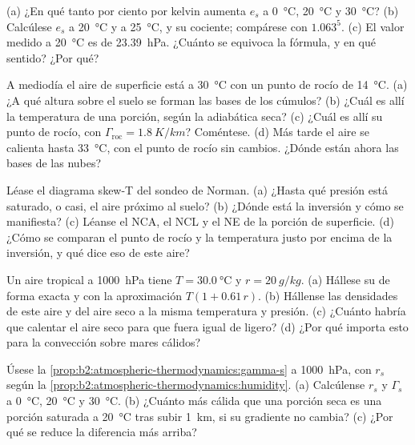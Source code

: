 \begin{exercise}[$\star$]\label{exo:b2:atmospheric-thermodynamics:2}
(a) ¿En qué tanto por ciento por kelvin aumenta $e_s$ a \qty{0}{\celsius}, \qty{20}{\celsius} y
\qty{30}{\celsius}? (b) Calcúlese $e_s$ a \qty{20}{\celsius} y a \qty{25}{\celsius}, y su
cociente; compárese con $1.063^5$. (c) El valor medido a \qty{20}{\celsius} es de
\qty{23.39}{hPa}. ¿Cuánto se equivoca la fórmula, y en qué sentido? ¿Por qué?
\end{exercise}

\begin{exercise}[$\star$]\label{exo:b2:atmospheric-thermodynamics:3}
A mediodía el aire de superficie está a \qty{30}{\celsius} con un punto de rocío de \qty{14}{\celsius}. (a) ¿A
qué altura sobre el suelo se forman las bases de los cúmulos? (b) ¿Cuál es allí la temperatura de una porción,
según la adiabática seca? (c) ¿Cuál es allí su punto de rocío, con $\Gamma_{\text{roc}} =
\qty{1.8}{K/km}$? Coméntese. (d) Más tarde el aire se calienta hasta \qty{33}{\celsius}, con el punto de rocío
sin cambios. ¿Dónde están ahora las bases de las nubes?
\end{exercise}

\begin{exercise}[$\star$]\label{exo:b2:atmospheric-thermodynamics:4}
Léase el diagrama skew-T del sondeo de Norman. (a) ¿Hasta qué presión está saturado, o casi, el aire próximo al
suelo? (b) ¿Dónde está la inversión y cómo se manifiesta? (c) Léanse el
NCA, el NCL y el NE de la porción de superficie. (d) ¿Cómo se comparan el punto de rocío y la temperatura
justo por encima de la inversión, y qué dice eso de este aire?
\end{exercise}

\begin{exercise}[$\star\star$]\label{exo:b2:atmospheric-thermodynamics:5}
Un aire tropical a \qty{1000}{hPa} tiene $T = \qty{30.0}{\celsius}$ y $r = \qty{20}{g/kg}$. (a) Hállese
su  de forma exacta y con la aproximación $T(1 + 0.61\,r)$. (b) Hállense las densidades
de este aire y del aire seco a la misma temperatura y presión. (c) ¿Cuánto habría que calentar el aire seco
para que fuera igual de ligero? (d) ¿Por qué importa esto para la convección sobre mares cálidos?
\end{exercise}

\begin{exercise}[$\star\star$]\label{exo:b2:atmospheric-thermodynamics:6}
Úsese la \cref{prop:b2:atmospheric-thermodynamics:gamma-s} a \qty{1000}{hPa}, con $r_s$ según la
\cref{prop:b2:atmospheric-thermodynamics:humidity}. (a) Calcúlense $r_s$ y $\Gamma_s$ a
\qty{0}{\celsius}, \qty{20}{\celsius} y \qty{30}{\celsius}. (b) ¿Cuánto más cálida que una porción seca
es una porción saturada a \qty{20}{\celsius} tras subir \qty{1}{km}, si su gradiente
no cambia? (c) ¿Por qué se reduce la diferencia más arriba?
\end{exercise}

